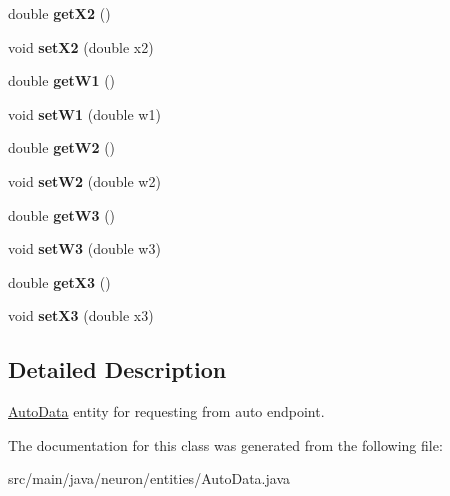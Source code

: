 \begin{DoxyCompactItemize}
double {\bfseries get\+X2} ()
\item 
\mbox{\label{classneuron_1_1entities_1_1AutoData_a0badcd7326ab5619abeb7b6504d6de6c}} 
void {\bfseries set\+X2} (double x2)
\item 
\mbox{\label{classneuron_1_1entities_1_1AutoData_a8d96978988c70594a8eb4f59e1880d5a}} 
double {\bfseries get\+W1} ()
\item 
\mbox{\label{classneuron_1_1entities_1_1AutoData_a5e7e998d9977f8053f2158d578def3f9}} 
void {\bfseries set\+W1} (double w1)
\item 
\mbox{\label{classneuron_1_1entities_1_1AutoData_a014d7fd15d5178fa3d96bbb291b020a6}} 
double {\bfseries get\+W2} ()
\item 
\mbox{\label{classneuron_1_1entities_1_1AutoData_a0925f7e44300026d2814a0a44ccf1efd}} 
void {\bfseries set\+W2} (double w2)
\item 
\mbox{\label{classneuron_1_1entities_1_1AutoData_a5f18bc66588126133f36f190edffd749}} 
double {\bfseries get\+W3} ()
\item 
\mbox{\label{classneuron_1_1entities_1_1AutoData_a7043dff20da60825ad0c1593d9b76264}} 
void {\bfseries set\+W3} (double w3)
\item 
\mbox{\label{classneuron_1_1entities_1_1AutoData_a58e17057511f77022ece961973b1bd81}} 
double {\bfseries get\+X3} ()
\item 
\mbox{\label{classneuron_1_1entities_1_1AutoData_ab96497d5d7101dec8a79de610d96c7a8}} 
void {\bfseries set\+X3} (double x3)
\end{DoxyCompactItemize}


\subsection{Detailed Description}
\hyperlink{classneuron_1_1entities_1_1AutoData}{Auto\+Data} entity for requesting from auto endpoint. 

The documentation for this class was generated from the following file\+:\begin{DoxyCompactItemize}
\item 
src/main/java/neuron/entities/Auto\+Data.\+java\end{DoxyCompactItemize}
